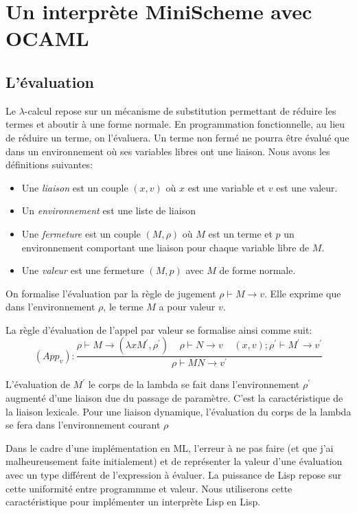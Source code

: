 \documentclass[11pt]{book}
\begin{document}
\section{Un interprète MiniScheme avec OCAML}

\subsection{L'évaluation}
Le $\lambda$-calcul repose sur un mécanisme de substitution permettant de réduire les termes et
aboutir à une forme normale. En programmation fonctionnelle, au lieu de réduire un terme, on
l'évaluera. Un terme non fermé ne pourra être évalué que dans un environnement où ses 
variables libres ont une liaison. Nous avons les définitions suivantes:
\begin{itemize}
	\item Une \textit{liaison} est un couple $(x,v)$ où $x$ est une variable et $v$ est une valeur.
	\item Un \textit{environnement} est une liste de liaison
	\item Une \textit{fermeture} est un couple $(M,\rho)$ où $M$ est un terme et $p$ un environnement 
	comportant une liaison pour chaque variable libre de $M$.
	\item Une \textit{valeur} est une fermeture $(M,p)$ avec $M$ de forme normale.
\end{itemize}
On formalise l'évaluation par la règle de jugement $\rho \vdash M \rightarrow v$. Elle exprime
que dans l'environnement $\rho$, le terme $M$ a pour valeur $v$.

La règle d'évaluation de l'appel par valeur se formalise ainsi comme suit:
\[(App_v): \frac{\rho \vdash M \rightarrow (\lambda x M^{'} , \rho ^{'} )  
		\ \ \ \ \ \rho \vdash N \rightarrow v \ \ \ \ \ (x,v);\rho ^{'} \vdash M^{'} \rightarrow v^{'} }
		 { \rho \vdash M N \rightarrow v^{'} }
\]


L'évaluation de $M^{'}$ le corps de la lambda se fait dans l'environnement $\rho ^{'}$ augmenté 
d'une liaison due du passage de paramètre. C'est la caractéristique de la liaison lexicale.
Pour  une liaison dynamique, l'évaluation du corps de la lambda se fera  dans l'environnement
courant $\rho$

Dans le cadre d'une implémentation en ML, l'erreur à ne pas faire (et que j'ai malheureusement faite initialement) et de
représenter la valeur d'une évaluation avec un type différent de l'expression à évaluer.
La puissance de Lisp repose sur  cette uniformité entre programmme et valeur. Nous utiliserons cette caractéristique pour
implémenter un interprète Lisp en Lisp.
\end{document}
